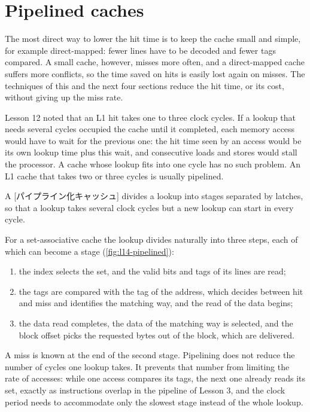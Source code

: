 \documentclass[../main.tex]{subfiles}
\begin{document}
\section{Pipelined caches}
\label{sec:l14-pipelined}

The most direct way to lower the hit time is to keep the cache small and
simple, for example direct-mapped: fewer lines have to be decoded and fewer
tags compared.  A small cache,
however, misses more often, and a direct-mapped cache suffers more conflicts,
so the time saved on hits is easily lost again on misses.  The techniques of
this and the next four sections reduce the hit time, or its cost, without
giving up the miss rate.

Lesson 12 noted that an L1 hit takes one to three clock
cycles.  If a lookup
that needs several cycles occupied the cache until it completed, each memory
access would have to wait for the previous one: the hit time seen by an
access would be its own lookup time plus this wait, and consecutive loads and
stores would stall the processor.  A cache whose lookup fits into one cycle
has no such problem.  An L1 cache that takes two or three cycles is usually
pipelined.

\begin{definition}
  A [パイプライン化キャッシュ] divides a lookup into
  stages separated by latches, so that a lookup takes several clock cycles but
  a new lookup can start in every cycle.
\end{definition}

For a set-associative cache the lookup divides naturally into three steps,
each of which can become a stage (\cref{fig:l14-pipelined}):
\begin{enumerate}
  \item the index selects the set, and the valid bits and tags of its lines
    are read;
  \item the tags are compared with the tag of the address, which decides
    between hit and miss and identifies the matching way, and the read of the
    data begins;
  \item the data read completes, the data of the matching way is selected,
    and the block offset picks the requested bytes out of the block, which are
    delivered.
\end{enumerate}
A miss is known at the end of the second stage.
Pipelining does not reduce
the number of cycles one lookup takes.  It prevents that number from limiting
the rate of accesses: while one access compares its tags, the next one already
reads its set, exactly as instructions overlap in the pipeline of Lesson 3,
and the clock period needs to accommodate only the slowest stage instead of
the whole lookup.
\end{document}
